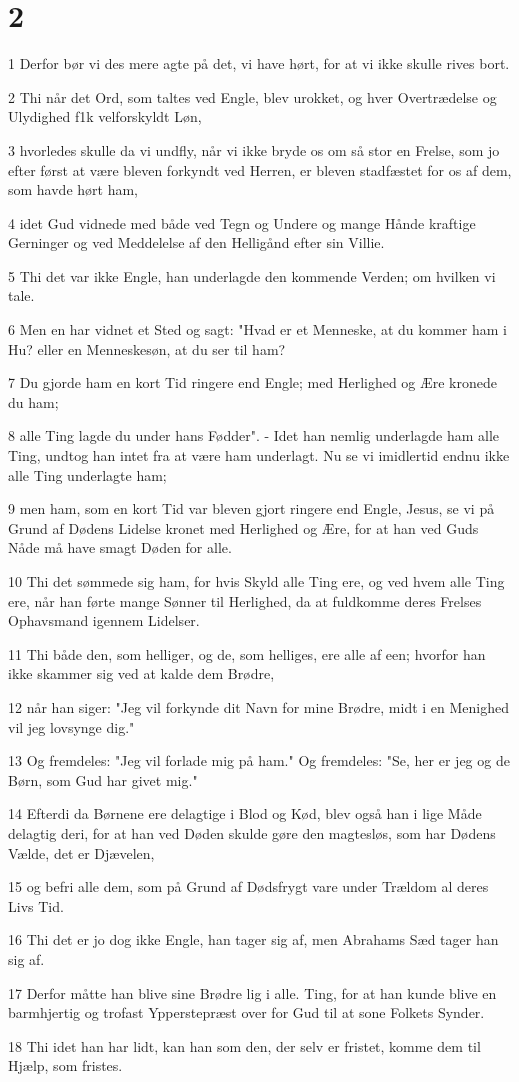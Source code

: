 \chapter{2}

\par 1 Derfor bør vi des mere agte på det, vi have hørt, for at vi ikke skulle rives bort.
\par 2 Thi når det Ord, som taltes ved Engle, blev urokket, og hver Overtrædelse og Ulydighed f1k velforskyldt Løn,
\par 3 hvorledes skulle da vi undfly, når vi ikke bryde os om så stor en Frelse, som jo efter først at være bleven forkyndt ved Herren, er bleven stadfæstet for os af dem, som havde hørt ham,
\par 4 idet Gud vidnede med både ved Tegn og Undere og mange Hånde kraftige Gerninger og ved Meddelelse af den Helligånd efter sin Villie.
\par 5 Thi det var ikke Engle, han underlagde den kommende Verden; om hvilken vi tale.
\par 6 Men en har vidnet et Sted og sagt: "Hvad er et Menneske, at du kommer ham i Hu? eller en Menneskesøn, at du ser til ham?
\par 7 Du gjorde ham en kort Tid ringere end Engle; med Herlighed og Ære kronede du ham;
\par 8 alle Ting lagde du under hans Fødder". - Idet han nemlig underlagde ham alle Ting, undtog han intet fra at være ham underlagt. Nu se vi imidlertid endnu ikke alle Ting underlagte ham;
\par 9 men ham, som en kort Tid var bleven gjort ringere end Engle, Jesus, se vi på Grund af Dødens Lidelse kronet med Herlighed og Ære, for at han ved Guds Nåde må have smagt Døden for alle.
\par 10 Thi det sømmede sig ham, for hvis Skyld alle Ting ere, og ved hvem alle Ting ere, når han førte mange Sønner til Herlighed, da at fuldkomme deres Frelses Ophavsmand igennem Lidelser.
\par 11 Thi både den, som helliger, og de, som helliges, ere alle af een; hvorfor han ikke skammer sig ved at kalde dem Brødre,
\par 12 når han siger: "Jeg vil forkynde dit Navn for mine Brødre, midt i en Menighed vil jeg lovsynge dig."
\par 13 Og fremdeles: "Jeg vil forlade mig på ham." Og fremdeles: "Se, her er jeg og de Børn, som Gud har givet mig."
\par 14 Efterdi da Børnene ere delagtige i Blod og Kød, blev også han i lige Måde delagtig deri, for at han ved Døden skulde gøre den magtesløs, som har Dødens Vælde, det er Djævelen,
\par 15 og befri alle dem, som på Grund af Dødsfrygt vare under Trældom al deres Livs Tid.
\par 16 Thi det er jo dog ikke Engle, han tager sig af, men Abrahams Sæd tager han sig af.
\par 17 Derfor måtte han blive sine Brødre lig i alle. Ting, for at han kunde blive en barmhjertig og trofast Ypperstepræst over for Gud til at sone Folkets Synder.
\par 18 Thi idet han har lidt, kan han som den, der selv er fristet, komme dem til Hjælp, som fristes.

